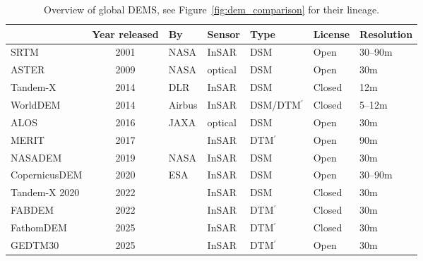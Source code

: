 \begin{table}[]
  \begin{tabular}{@{}lclllll@{}}
    \toprule
    & Year released & By                 & Sensor  & Type               & License & Resolution \\
    \midrule
    SRTM          & 2001          & NASA               & InSAR   & DSM                & Open    & 30--90m    \\
    ASTER         & 2009          & NASA               & optical & DSM                & Open    & 30m        \\
    Tandem-X      & 2014          & DLR                & InSAR   & DSM                & Closed  & 12m        \\
    WorldDEM      & 2014          & Airbus             & InSAR   & DSM/DTM$^{\prime}$ & Closed  & 5--12m     \\
    ALOS          & 2016          & JAXA               & optical & DSM                & Open    & 30m        \\
    MERIT         & 2017          & \citet{Yamazaki17} & InSAR   & DTM$^{\prime}$     & Open    & 90m        \\
    NASADEM       & 2019          & NASA               & InSAR   & DSM                & Open    & 30m        \\
    CopernicusDEM & 2020          & ESA                & InSAR   & DSM                & Open    & 30--90m    \\
    Tandem-X 2020        & 2022          & \citet{wessel2022}   & InSAR   & DSM     & Closed  & 30m        \\
    FABDEM        & 2022          & \citet{Hawker22}   & InSAR   & DTM$^{\prime}$     & Closed  & 30m        \\
    FathomDEM        & 2025          & \citet{uhe2025}   & InSAR   & DTM$^{\prime}$     & Closed  & 30m        \\
    GEDTM30        & 2025          & \citet{ho2025}   & InSAR   & DTM$^{\prime}$     & Open  & 30m        \\
    \bottomrule
  \end{tabular}
  \caption{Overview of global DEMS, see Figure~\ref{fig:dem_comparison} for their lineage.}%
  \label{tab:gdem_overview}
\end{table}


